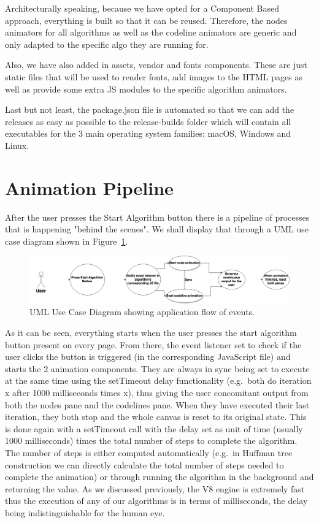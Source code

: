 \documentclass{l4proj}
\begin{document}
Architecturally speaking, because we have opted for a Component Based approach, everything is built so that it can be
reused. Therefore, the nodes animators for all algorithms as well as the codeline animators are generic and only
adapted to the specific algo they are running for. 

Also, we have also added in assets, vendor and fonts components. These are just static files that will be used to render fonts,
add images to the HTML pages as well as provide some extra JS modules to the specific algorithm animators. 

Last but not least, the package.json file is automated so that we can add the releases as easy as possible to the
release-builds folder which will contain all executables for the 3 main operating system families: macOS, Windows and
Linux.

\section{Animation Pipeline}

After the user presses the Start Algorithm button there is a pipeline of processes that is happening "behind the
scenes". We shall display that through a UML use case diagram shown in
Figure~\ref{fig:animation_uml_use_case_diagram}.

\pagebreak

\begin{figure}[!ht]
    \centering
    \includegraphics[scale=0.3]{animation_uml_use_case_diagram}
    \caption{UML Use Case Diagram showing application flow of events.}
    \label{fig:animation_uml_use_case_diagram}
\end{figure}

As it can be seen, everything starts when the user presses the start algorithm button present on every page. From
there, the event listener set to check if the user clicks the button is triggered (in the corresponding JavaScript
file) and starts the 2 animation components. They are always in sync being set to execute at the same time using the
setTimeout delay functionality (e.g.\ both do iteration x after 1000 milliseconds times x), thus giving the user
concomitant output from both the nodes pane and the codelines pane. When they have executed their last iteration, they
both stop and the whole canvas is reset to its original state. This is done again with a setTimeout call with the delay
set as unit of time (usually 1000 milliseconds) times the total number of steps to complete the algorithm. The number
of steps is either computed automatically (e.g.\ in Huffman tree construction we can directly calculate the total number
of steps needed to complete the animation) or through running the algorithm in the background and returning the value.
As we discussed previously, the V8 engine is extremely fast thus the execution of any of our algorithms is in terms of
milliseconds, the delay being indistinguishable for the human eye. 
\end{document}
